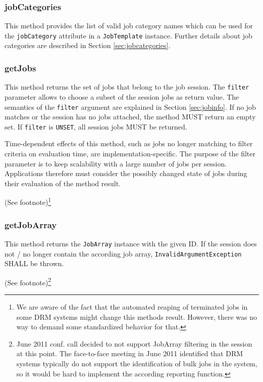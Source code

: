 \documentclass{article}
\newcommand{\h}[1]{\lstinline|#1|}
\newcommand{\rat}[1]{ {\tiny(See footnote)}\footnote{#1} }
\begin{document}
\subsubsection{jobCategories}
\label{sec:jobcategorieslist}

This method provides the list of valid job category names which can be used for the \h{jobCategory} attribute in a \h{JobTemplate} instance. Further details about job categories are described in Section \ref{sec:jobcategories}.

\subsubsection{getJobs}

This method returns the set of jobs that belong to the job session. The \h{filter} parameter allows to choose a subset of the session jobs as return value. The semantics of the \h{filter} argument are explained in Section \ref{sec:jobinfo}. If no job matches or the session has no jobs attached, the method MUST return an empty set. If \h{filter} is \h{UNSET}, all session jobs MUST be returned.

Time-dependent effects of this method, such as jobs no longer matching to filter criteria on evaluation time, are implementation-specific. The purpose of the filter parameter is to keep scalability with a large number of jobs per session. Applications therefore must consider the possibly changed state of jobs during their evaluation of the method result.

\rat{We are aware of the fact that the automated reaping of terminated jobs in some DRM systems might change this methods result. However, there was no way to demand some standardized behavior for that.}

\subsubsection{getJobArray}

This method returns the \h{JobArray} instance with the given ID. If the session does not / no longer contain the according job array, \h{InvalidArgumentException} SHALL be thrown.

\rat {
June 2011 conf. call decided to not support JobArray filtering in the session at this point. The face-to-face meeting in June 2011 identified that DRM systems typically do not support the identification of bulk jobs in the system, so it would be hard to implement the according reporting function.
}
\end{document}
